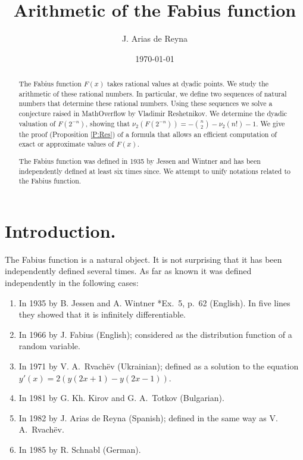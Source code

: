 \documentclass[10pt]{amsart}
\title{Arithmetic of the Fabius function}
\author{J. Arias de Reyna}
\date{\today}
\theoremstyle{definition}
\theoremstyle{remark}
\begin{document}
\newcommand{\arctanh}{\mathop{\rm arctanh }}
\def\Re{\operatorname{Re}}
\def\Im{\operatorname{Im}}
\def\Hermite{\operatorname{\mathcal H}}
\def\den{\operatorname{den}}

\newcommand{\Orden}{\mathop{\hbox{\cmbsy O}}\nolimits}

\begin{abstract}
The Fabius function $F(x)$ takes rational values at dyadic points. We study the
arithmetic of these rational numbers. In particular, we define two sequences
of natural numbers that determine these rational numbers. Using these sequences
we solve
a conjecture raised  in MathOverflow by Vladimir Reshetnikov.
We determine the dyadic valuation of $F(2^{-n})$, showing that
$\nu_2(F(2^{-n}))=-\binom{n}{2}-\nu_2(n!)-1$.
We give the proof  (Proposition \ref{P:Res}) of  a formula that allows an efficient computation
of exact or approximate values of $F(x)$.

The Fabius function was defined in 1935 by
Jessen and Wintner and has been independently defined  at least
six times since.
We attempt to unify notations related to the Fabius function.
\end{abstract}

\maketitle

\section{Introduction.}
The Fabius function is a natural object. It is not surprising that it has been
independently  defined several times. As far as known it was defined independently
in the following cases:
\begin{enumerate}
\item In 1935 by  B. Jessen and A. Wintner  \cite{MR1501802}*{Ex.~5, p.~62} (English). In five lines
they showed that it is infinitely differentiable.

\item In 1966 by J. Fabius \cite{MR0197656} (English); considered  as the distribution function
of a random variable.

\item In 1971 by  V. A.~Rvach{\"e}v   \cite{MR0296237} (Ukrainian); defined
as a solution to the equation
$y'(x)=2(y(2x+1)-y(2x-1))$.

\item In 1981 by G. Kh. Kirov and G. A.~Totkov \cite{MR705073} (Bulgarian).

\item In 1982 by J. Arias de Reyna \cite{MR666839} (Spanish); defined  in the same way as V. A.~Rvach{\"e}v.

\item In 1985  by R. Schnabl \cite{MR1031820} (German).
\end{enumerate}
\end{document}
